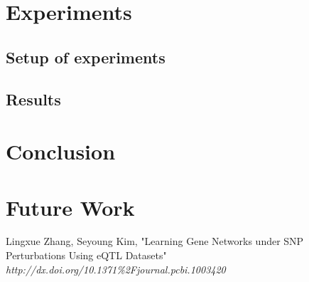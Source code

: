 \documentclass{ba-kecs}
\numberwithin{figure}{section}
\numberwithin{equation}{section}
\begin{document}
\section{Experiments}
\subsection{Setup of experiments}
\subsection{Results}

\section{Conclusion}

\section{Future Work}




\begin{thebibliography}{99}
 Lingxue Zhang, Seyoung Kim, "Learning Gene Networks under SNP Perturbations Using eQTL Datasets" \emph{http://dx.doi.org/10.1371\%2Fjournal.pcbi.1003420}

\end{thebibliography}

\appendix
\end{document}
